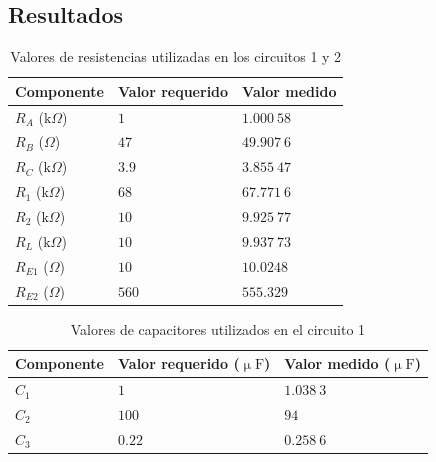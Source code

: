 \documentclass[journal]{IEEEtran}
\begin{document}
\vspace{1cm}


\subsection{Resultados}


\begin{table}[H]
        \centering
        \renewcommand{\arraystretch}{1.5}
        \caption{Valores de resistencias utilizadas en los circuitos 1 y 2}
        \begin{tabular}{ >{\centering\arraybackslash}m{2.5cm} >{\centering\arraybackslash}m{2.5cm} >{\centering\arraybackslash}m{2.5cm} }
                \hline
            \centering
            Componente & Valor requerido & Valor medido\\ 
            \hline
            \centering
            $R_A$ ($\mathrm{k}\Omega$) & $1$  & $1.000~58$  \\ 
            $R_B$ ($\Omega$) & $47$  & $49.907~6$  \\
            $R_C$ ($\mathrm{k}\Omega$) & $3.9$  & $3.855~47$  \\
            $R_1$ ($\mathrm{k}\Omega$) & $68$  & $67.771~6$ \\
            $R_2$ ($\mathrm{k}\Omega$) & $10$  & $9.925~77$ \\
            $R_L$ ($\mathrm{k}\Omega$) & $10$  & $9.937~73$ \\
            $R_{E1}$ ($\Omega$) & $10$  & $10.0248$ \\
            $R_{E2}$ ($\Omega$) & $560$  & $555.329$ \\
            \hline
        \end{tabular}
        \label{tabla1}
    \end{table}
    
\begin{table}[H]
        \centering
        \renewcommand{\arraystretch}{1.5}
        \caption{Valores de capacitores utilizados en el circuito 1}
        \begin{tabular}{ >{\centering\arraybackslash}m{2.5cm} >{\centering\arraybackslash}m{2.5cm} >{\centering\arraybackslash}m{2.5cm} }
                \hline
            Componente & Valor requerido ($\upmu\mathrm{F}$) & Valor medido ($\upmu\mathrm{F}$)\\ 
            \hline
            \centering
            $C_1$ & $1$  & $1.038~3$  \\ 
            $C_2$ & $100$  & $94$ \\
            $C_3$ & $0.22$  & $0.258~6$ \\
            \hline
        \end{tabular}
        \label{tabla2}
    \end{table}    
\end{document}
